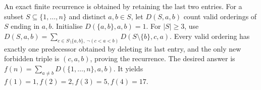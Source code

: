 An exact finite recurrence is obtained by retaining the last two entries. For a subset $S\subseteq\{1,\ldots,n\}$ and distinct $a,b\in S$, let $D(S,a,b)$ count valid orderings of $S$ ending in $a,b$. Initialise $D(\{a,b\},a,b)=1$. For $|S|\ge3$, use $D(S,a,b)=\sum_{c\in S\setminus\{a,b\},\ \neg(c<a<b)}D(S\setminus\{b\},c,a)$. Every valid ordering has exactly one predecessor obtained by deleting its last entry, and the only new forbidden triple is $(c,a,b)$, proving the recurrence. The desired answer is $\boxed{f(n)=\sum_{a\ne b}D(\{1,\ldots,n\},a,b)}$. It yields $f(1)=1,f(2)=2,f(3)=5,f(4)=17$.
